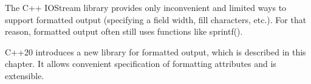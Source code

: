 The C++ IOStream library provides only inconvenient and limited ways to support formatted output (specifying a field width, fill characters, etc.). For that reason, formatted output often still uses functions like sprintf().

C++20 introduces a new library for formatted output, which is described in this chapter. It allows convenient specification of formatting attributes and is extensible.